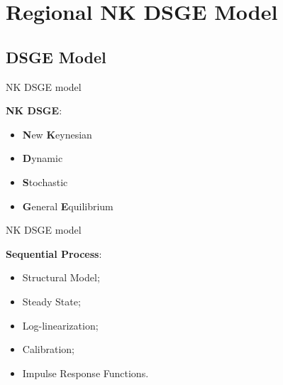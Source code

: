 \documentclass[../quali_slides.tex]{subfiles}
\begin{document}

\section{Regional NK DSGE Model}


\subsection{DSGE Model}

\begin{frame}{NK DSGE model}
	
	\large \textbf{NK DSGE}:
	
	\begin{itemize}
		
		\item \large \textbf{N}ew \textbf{K}eynesian 
		\item \large \textbf{D}ynamic 
		\item \large \textbf{S}tochastic 
		\item \large \textbf{G}eneral \textbf{E}quilibrium
		
	\end{itemize}
	
\end{frame}


\begin{frame}{NK DSGE model}
	
	\large \textbf{Sequential Process}:
	
	\begin{itemize}
		
		\item \large Structural Model;
		
		\item \large Steady State;
		
		\item \large Log-linearization;
		
		\item \large Calibration;
		
		\item \large Impulse Response Functions.
		
	\end{itemize}
	
\end{frame}
\end{document}
